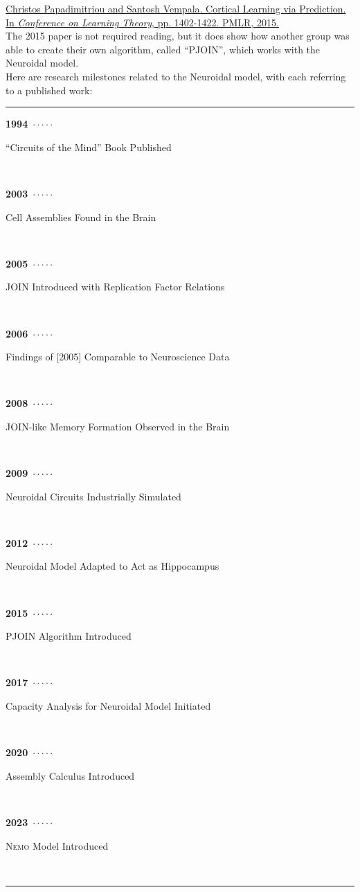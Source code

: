 \documentclass{article}
\begin{document}
\noindent 
\href{https://proceedings.mlr.press/v40/Papadimitriou15.html}{Christos Papadimitriou and Santosh Vempala. Cortical Learning via Prediction. In \textit{Conference on Learning Theory}, pp. 1402-1422. PMLR, 2015.} \\

\noindent The 2015 paper is not required reading, but it does show how another group was able to create their own algorithm, called ``PJOIN'', which works with the Neuroidal model. \\

Here are research milestones related to the Neuroidal model, with each referring to a published work:

\vspace{-2mm}

\newcommand\ytl[2]{
\parbox[b]{8em}{\hfill{\color{black}\bfseries #1}~$\cdot\cdot\cdot\cdot\cdot$~}\makebox[0pt][c]{$\bullet$}\vrule\quad \parbox[c]{9cm}{\vspace{7pt}\color{black}\raggedright #2\\[7pt]}\\[-3pt]} 

\begin{table}[h]
\centering
\begin{minipage}[t]{1.\linewidth}
\color{red}
\rule{\linewidth}{1pt}
\ytl{1994}{``Circuits of the Mind'' Book Published \cite{valiant1994}}
\ytl{2003}{Cell Assemblies Found in the Brain}
\ytl{2005}{JOIN Introduced with Replication Factor Relations \cite{valiant2005}}
\ytl{2006}{Findings of [2005] Comparable to Neuroscience Data}
\ytl{2008}{JOIN-like Memory Formation Observed in the Brain}
\ytl{2009}{Neuroidal Circuits Industrially Simulated}
\ytl{2012}{Neuroidal Model Adapted to Act as Hippocampus}
\ytl{2015}{PJOIN Algorithm Introduced \cite{papadim2015}}
\ytl{2017}{Capacity Analysis for Neuroidal Model Initiated \cite{valiant2017}}
\ytl{2020}{Assembly Calculus Introduced \cite{papadim2020}}
\ytl{2023}{\textsc{Nemo} Model Introduced}
\bigskip
\rule{\linewidth}{1pt}%
\end{minipage}%
\end{table}

\newpage

%
\end{document}
